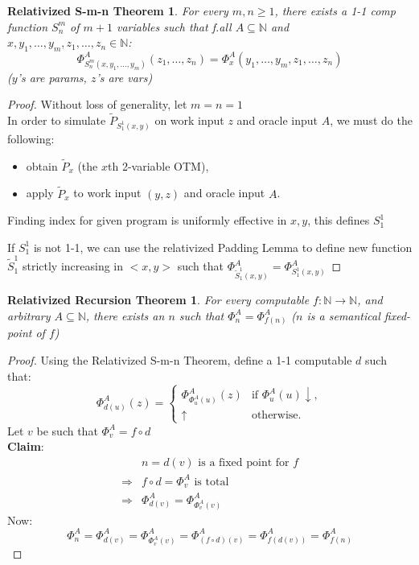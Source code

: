 \documentclass[12pt]{article}
\newcommand{\Nat}{\ensuremath{\mathbb{N}}}
\begin{document}
\newtheorem*{relsmn}{Relativized S-m-n Theorem}
\begin{relsmn}
For every $m,n \ge 1$, there exists a 1-1 comp function $S_n^m$ of $m+1$ variables such that f.all $A\subseteq \Nat$ and $x,y_1,\ldots,y_m, z_1, \ldots, z_n \in \Nat$:
\[\Phi^A_{S_n^m(x,y_1,\ldots,y_m)}(z_1, \ldots, z_n)
= \Phi^A_{x}(y_1,\ldots,y_m,z_1,\ldots,z_n)\]
		($y$'s are params, $z$'s are vars)
\end{relsmn}
%
\begin{proof}
Without loss of generality, let $m=n=1$ \\
In order to simulate $\tilde{P}_{S_1^1(x,y)}$
on work input $z$ and oracle input $A$, we must do the following:
\begin{itemize}
  \item
    obtain $\tilde{P}_x$ (the $x$th 2-variable OTM),
  \item
    apply $\tilde{P}_x$ to work input $(y,z)$ and oracle input $A$.
\end{itemize}
Finding index for given program is uniformly effective in $x,y$, this defines $S_1^1$

If $S_1^1$ is not 1-1, we can use the relativized Padding Lemma to define new function $\tilde{S}_1^1$ strictly increasing in $<x,y>$
such that $\Phi^A_{\tilde{S}_1^1(x,y)} = \Phi^A_{S_1^1(x,y)}$
\end{proof}


\newtheorem*{relrec}{Relativized Recursion Theorem}
\begin{relrec}
For every computable $f: \Nat \rightarrow \Nat$, 
and arbitrary $A \subseteq \Nat$,
there exists an $n$ such that $\Phi^A_n = \Phi^A_{f(n)}$
	($n$ is a semantical fixed-point of $f$)
\end{relrec}
%
\begin{proof}
Using the Relativized S-m-n Theorem, define a 1-1 computable $d$ such that:
\[
\Phi^A_{d(u)}(z) = \begin{cases}
  \Phi^A_{\Phi^A_u(u)}(z)		&\text{if } \Phi^A_u(u) \downarrow, \\
  \uparrow			&\text{otherwise.}
\end{cases}
\]
Let $v$ be such that $\Phi^A_v = f \circ d$ \\
{\bf Claim}:  
\begin{align*}
  & n = d(v) \text{ is a fixed point for } f \\
  \Rightarrow& f \circ d = \Phi^A_v \text{ is total} \\
  \Rightarrow& \Phi^A_{d(v)} = \Phi^A_{\Phi^A_v(v)}
\end{align*}
Now: \[
\Phi^A_n = \Phi^A_{d(v)} = \Phi^A_{\Phi^A_v(v)} = \Phi^A_{(f \circ d)(v)} = \Phi^A_{f(d(v))} = \Phi^A_{f(n)} 
\]
\end{proof}
\end{document}

